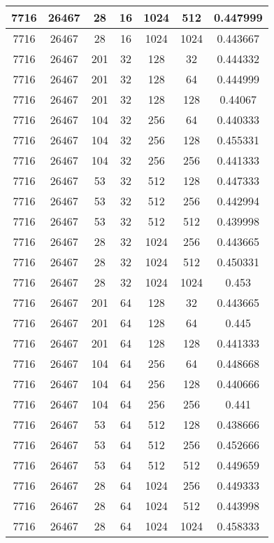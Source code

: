 \documentclass[9pt]{article}
\begin{document}
\begin{tabular}{|c|c|c|c|c|c|c| }
\hline
7716  & 26467  & 28  & 16  & 1024  & 512  & 0.447999 \\
\hline
7716  & 26467  & 28  & 16  & 1024  & 1024  & 0.443667 \\
\hline
7716  & 26467  & 201  & 32  & 128  & 32  & 0.444332 \\
\hline
7716  & 26467  & 201  & 32  & 128  & 64  & 0.444999 \\
\hline
7716  & 26467  & 201  & 32  & 128  & 128  & 0.44067 \\
\hline
7716  & 26467  & 104  & 32  & 256  & 64  & 0.440333 \\
\hline
7716  & 26467  & 104  & 32  & 256  & 128  & 0.455331 \\
\hline
7716  & 26467  & 104  & 32  & 256  & 256  & 0.441333 \\
\hline
7716  & 26467  & 53  & 32  & 512  & 128  & 0.447333 \\
\hline
7716  & 26467  & 53  & 32  & 512  & 256  & 0.442994 \\
\hline
7716  & 26467  & 53  & 32  & 512  & 512  & 0.439998 \\
\hline
7716  & 26467  & 28  & 32  & 1024  & 256  & 0.443665 \\
\hline
7716  & 26467  & 28  & 32  & 1024  & 512  & 0.450331 \\
\hline
7716  & 26467  & 28  & 32  & 1024  & 1024  & 0.453 \\
\hline
7716  & 26467  & 201  & 64  & 128  & 32  & 0.443665 \\
\hline
7716  & 26467  & 201  & 64  & 128  & 64  & 0.445 \\
\hline
7716  & 26467  & 201  & 64  & 128  & 128  & 0.441333 \\
\hline
7716  & 26467  & 104  & 64  & 256  & 64  & 0.448668 \\
\hline
7716  & 26467  & 104  & 64  & 256  & 128  & 0.440666 \\
\hline
7716  & 26467  & 104  & 64  & 256  & 256  & 0.441 \\
\hline
7716  & 26467  & 53  & 64  & 512  & 128  & 0.438666 \\
\hline
7716  & 26467  & 53  & 64  & 512  & 256  & 0.452666 \\
\hline
7716  & 26467  & 53  & 64  & 512  & 512  & 0.449659 \\
\hline
7716  & 26467  & 28  & 64  & 1024  & 256  & 0.449333 \\
\hline
7716  & 26467  & 28  & 64  & 1024  & 512  & 0.443998 \\
\hline
7716  & 26467  & 28  & 64  & 1024  & 1024  & 0.458333 \\

\end{tabular}
\end{document}
